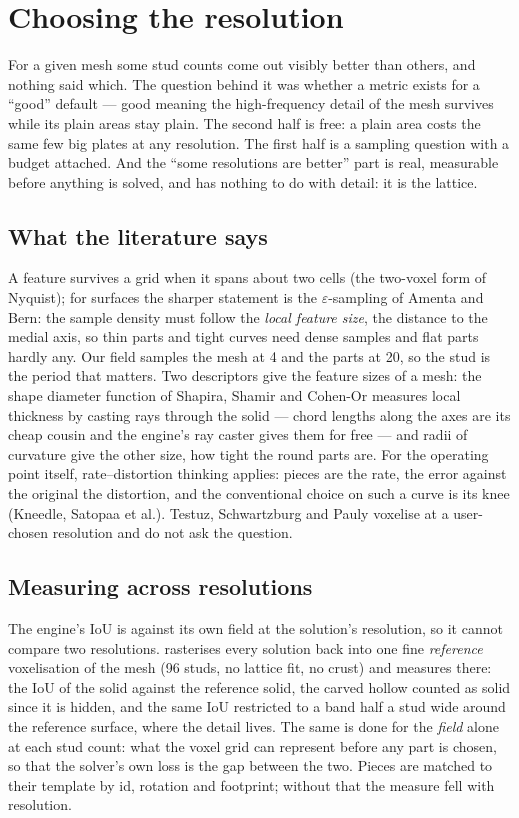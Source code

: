 \section{Choosing the resolution}\label{sec:resolution}
For a given mesh some stud counts come out visibly better than others, and nothing said which. The question behind it was
whether a metric exists for a ``good'' default --- good meaning the high-frequency detail of the mesh survives while its plain
areas stay plain. The second half is free: a plain area costs the same few big plates at any resolution. The first half is a
sampling question with a budget attached. And the ``some resolutions are better'' part is real, measurable before anything is
solved, and has nothing to do with detail: it is the lattice.

\subsection{What the literature says}
A feature survives a grid when it spans about two cells (the two-voxel form of Nyquist); for surfaces the sharper statement is the
$\varepsilon$-sampling of Amenta and Bern: the sample density must follow the \emph{local feature size}, the distance to the medial
axis, so thin parts and tight curves need dense samples and flat parts hardly any. Our field samples the mesh at 4\ldu{} and the
parts at 20\ldu, so the stud is the period that matters. Two descriptors give the feature sizes of a mesh: the shape diameter
function of Shapira, Shamir and Cohen-Or measures local thickness by casting rays through the solid --- chord lengths along the
axes are its cheap cousin and the engine's ray caster gives them for free --- and radii of curvature give the other size, how tight
the round parts are. For the operating point itself, rate--distortion thinking applies: pieces are the rate, the error against
the original the distortion, and the conventional choice on such a curve is its knee (Kneedle, Satopaa et al.). Testuz,
Schwartzburg and Pauly voxelise at a user-chosen resolution and do not ask the question.

\subsection{Measuring across resolutions}
The engine's IoU is against its own field at the solution's resolution, so it cannot compare two resolutions.
 rasterises every solution back into one fine \emph{reference} voxelisation of the mesh (96 studs,
no lattice fit, no crust) and measures there: the IoU of the solid against the reference solid, the carved hollow counted as
solid since it is hidden, and the same IoU restricted to a band half a stud wide around the reference surface, where the detail
lives. The same is done for the \emph{field} alone at each stud count: what the voxel grid can represent before any part is chosen,
so that the solver's own loss is the gap between the two. Pieces are matched to their template by id, rotation and footprint;
without that the measure fell with resolution.

